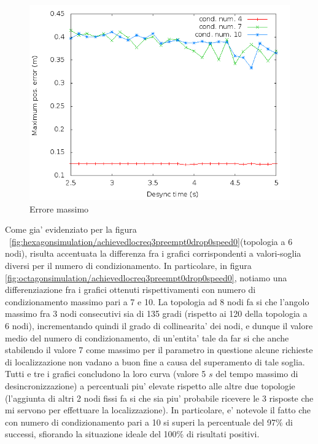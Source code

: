 \documentclass[Lau,binding=0.6cm]{sapthesis}
\begin{document}
\begin{figure}[H]
    \centering
    \includegraphics[scale=0.5]{octagonsimulation/maxposerrorreq3preempt0drop0speed0.png}
    \caption{Errore massimo}
    \label{fig:octagonsimulation/maxposerrorreq3preempt0drop0speed0}
\end{figure}
Come gia' evidenziato per la figura ~\ref{fig:hexagonsimulation/achievedlocreq3preempt0drop0speed0}(topologia a 6 nodi), risulta accentuata la differenza fra i grafici corrispondenti a valori-soglia diversi per il numero di condizionamento. In particolare, in figura \ref{fig:octagonsimulation/achievedlocreq3preempt0drop0speed0}, notiamo una differenziazione fra i grafici ottenuti rispettivamenti con numero di condizionamento massimo pari a 7 e 10. La topologia ad 8 nodi fa si che l'angolo massimo fra 3 nodi consecutivi sia di 135 gradi (rispetto ai 120 della topologia a 6 nodi), incrementando quindi il grado di collinearita' dei nodi, e dunque il valore medio del numero di condizionamento, di un'entita' tale da far si che anche stabilendo il valore 7 come massimo per il parametro in questione alcune richieste di localizzazione non vadano a buon fine a causa del superamento di tale soglia.
Tutti e tre i grafici concludono la loro curva (valore 5 $s$ del tempo massimo di desincronizzazione) a percentuali piu' elevate rispetto alle altre due topologie (l'aggiunta di altri 2 nodi fissi fa si che sia piu' probabile ricevere le 3 risposte che mi servono per effettuare la localizzazione). In particolare, e' notevole il fatto che  con numero di condizionamento pari a 10 si superi la percentuale del 97\% di successi, sfiorando la situazione ideale del 100\% di risultati positivi.
\end{document}
